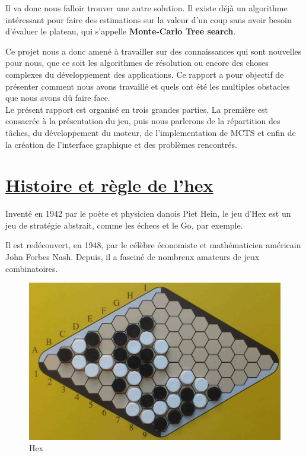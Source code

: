 \documentclass[12pt]{article}
\begin{document}
Il va donc nous falloir trouver une autre solution. Il existe déjà un algorithme intéressant pour faire des estimations sur la valeur d'un coup sans avoir besoin d'évaluer le plateau, qui s'appelle \textbf{Monte-Carlo Tree search}.

Ce projet nous a donc amené à travailler sur des connaissances qui sont nouvelles pour nous, que ce soit les  algorithmes de résolution ou encore des choses complexes du développement des applications. Ce rapport a pour objectif de présenter comment nous avons travaillé et quels ont été les multiples obstacles que nous avons dû faire face.
	\\
Le présent rapport est organisé en trois grandes parties. La première est consacrée à la présentation du jeu, puis nous parlerons de la répartition des tâches, du développement du moteur, de l'implementation de MCTS  et enfin de la création  de l'interface graphique et des problèmes rencontrés.
\newpage
\section{\underline{Histoire et règle de l’hex}}

	Inventé en 1942 par le poète et physicien danois Piet Hein, le jeu d'Hex est un jeu de stratégie abstrait, comme les échecs et le Go, par exemple.

    Il est redécouvert, en 1948, par le célèbre économiste et mathématicien américain John Forbes Nash. Depuis, il a  fasciné de nombreux amateurs de jeux combinatoires.  

\begin{figure}[h!]
	\begin{center}
		\includegraphics[width=1\textwidth]{images/JeuPlateau.jpg}
	\end{center}
	\caption{Hex}
	\label{plateau}
\end{figure}
	\newpage
\end{document}
